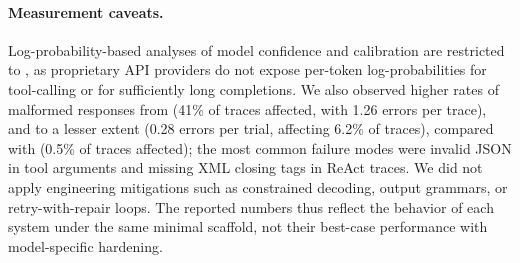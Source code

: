 \paragraph{Measurement caveats.}
Log-probability-based analyses of model confidence and calibration are restricted to \gptossfull, as proprietary API providers do not expose per-token log-probabilities for tool-calling or for sufficiently long completions. We also observed higher rates of malformed responses from \gptoss (41\% of traces affected, with 1.26 errors per trace), and to a lesser extent \gptfourO (0.28 errors per trial, affecting 6.2\% of traces), compared with \claudesonnet (0.5\% of traces affected); the most common failure modes were invalid JSON in tool arguments and missing XML closing tags in ReAct traces. We did not apply engineering mitigations such as constrained decoding, output grammars, or retry-with-repair loops. The reported numbers thus reflect the behavior of each system under the same minimal scaffold, not their best-case performance with model-specific hardening.